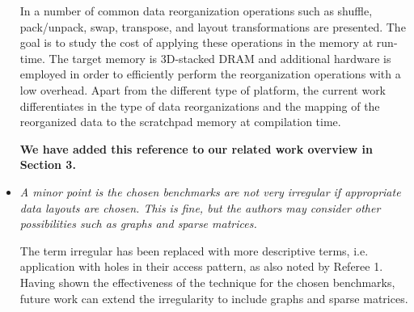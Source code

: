 \documentclass[12pt,a4paper,notitlepage]{article}
\begin{document}
\begin{itemize}
In \cite{3D} a number of common data reorganization operations such as shuffle, pack/unpack, swap, transpose, and layout transformations are presented. 
The goal is to study the cost of applying these operations in the memory at run-time. The target memory is 3D-stacked DRAM and additional hardware is employed in order to efficiently perform the reorganization operations with a low overhead. 
Apart from the different type of platform, the current work differentiates in the type of data reorganizations and the mapping of the reorganized data to the scratchpad memory at compilation time.

\textbf{We have added this reference to our related work overview in Section 3.}


\item \textit{A minor point is the chosen benchmarks are not very irregular if appropriate data layouts are chosen.  This is fine, but the authors may consider other possibilities such as graphs and sparse matrices.}

The term irregular has been replaced with more descriptive terms, i.e. application with holes in their access pattern, as also noted by Referee 1. 
Having shown the effectiveness of the technique for the chosen benchmarks, future work can extend the irregularity to include graphs and sparse matrices.


\end{itemize}



  
\end{document}
